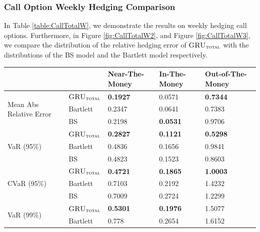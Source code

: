 \documentclass[letterpaper,12pt,titlepage,oneside,final]{book}
\numberwithin{equation}{section}
\theoremstyle{definition}
\newcommand{\modelT}{\textsc{GRU}_{\textsc{total}}}
\begin{document}
\subsubsection{Call Option Weekly Hedging Comparison}
In Table \ref{table:CallTotalW}, we demonstrate the results on weekly hedging call options. Furthermore, in  Figure \ref{fig:CallTotalW2}, and  Figure \ref{fig:CallTotalW3}, we compare the distribution of the relative hedging error of $\modelT$ with the distributions of the BS model and the Bartlett model respectively.
\begin{table}[htp!]
	\centering
	\begin{tabular}{ll|l|l|l|}
		\cline{3-5}
		&          & Near-The-Money   & In-The-Money     & Out-of-The-Money \\ \hline
		\multicolumn{1}{|l|}{\multirow{3}{*}{Mean Abs Relative Error}} & $\modelT$    & \textbf{0.1927}  & 0.0571  & \textbf{0.7344}  \\  
		\multicolumn{1}{|l|}{}                                & Bartlett & 0.2347           & 0.0641           & 0.7383           \\  
		\multicolumn{1}{|l|}{}                                & BS       & 0.2198           &\textbf{0.0531}           & 0.9706           \\ \hline
		\multicolumn{1}{|l|}{\multirow{3}{*}{VaR (95\%)}}     & $\modelT$    & \textbf{0.2827} & \textbf{0.1121} & \textbf{0.5298} \\  
		\multicolumn{1}{|l|}{}                                & Bartlett & 0.4836          & 0.1656          & 0.9841          \\  
		\multicolumn{1}{|l|}{}                                & BS       & 0.4823          & 0.1523          & 0.8603          \\ \hline
		\multicolumn{1}{|l|}{\multirow{3}{*}{CVaR (95\%)}}    & $\modelT$    & \textbf{0.4721} & \textbf{0.1865} & \textbf{1.0003} \\  
		\multicolumn{1}{|l|}{}                                & Bartlett & 0.7103          & 0.2192          & 1.4232          \\  
		\multicolumn{1}{|l|}{}                                & BS       & 0.7009          & 0.2724          & 1.2299          \\ \hline
		\multicolumn{1}{|l|}{\multirow{3}{*}{VaR (99\%)}}     & $\modelT$    & \textbf{0.5301} & \textbf{0.1976} & 1.5077          \\  
		\multicolumn{1}{|l|}{}                                & Bartlett & 0.778           & 0.2654          & 1.6152          \\  

\end{tabular}
\end{table}
\end{document}
